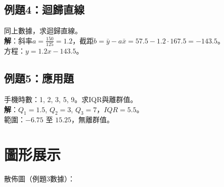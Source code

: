 \subsection{例題4：迴歸直線}
同上數據，求迴歸直線。\\
\textbf{解}：斜率$a = \frac{150}{125} = 1.2$，截距$b = \bar{y} - a \bar{x} = 57.5 - 1.2 \cdot 167.5 = -143.5$。\\
方程：$y = 1.2x - 143.5$。

\subsection{例題5：應用題}
手機時數：1, 2, 3, 5, 9。求IQR與離群值。\\
\textbf{解}：$Q_1 = 1.5$, $Q_2 = 3$, $Q_3 = 7$，$IQR = 5.5$。\\
範圍：$-6.75$ 至 $15.25$，無離群值。

\section{圖形展示}
散佈圖（例題3數據）：

